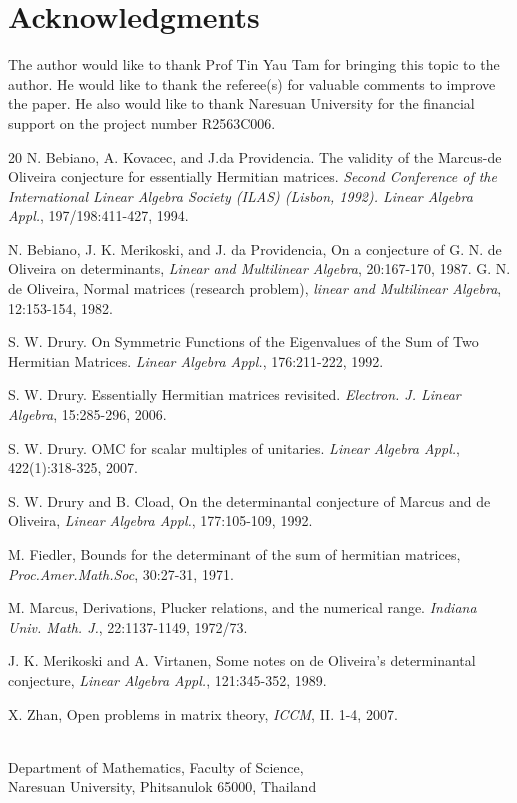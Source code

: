 \documentclass[11pt]{amsart}
\numberwithin{equation}{section}
\numberwithin{equation}{section}
\begin{document}
\section*{Acknowledgments}

The author would like to thank Prof Tin Yau Tam for bringing this topic to the author.  He would like to thank the referee(s) for valuable comments to improve the paper.  He also would like to thank Naresuan University for the financial support on the project number R2563C006.

\begin{thebibliography}{20}
     	N. Bebiano, A. Kovacec, and J.da Providencia. The validity of the Marcus-de Oliveira conjecture for essentially Hermitian matrices. \emph{Second Conference of the International Linear Algebra Society (ILAS) (Lisbon, 1992). Linear Algebra Appl.}, 197/198:411-427, 1994.
	
		N. Bebiano, J. K. Merikoski, and J. da Providencia, On a conjecture of G. N. de Oliveira on determinants, \emph{Linear and Multilinear Algebra}, 20:167-170, 1987.
		G. N. de Oliveira, Normal matrices (research problem),\emph{ linear and Multilinear Algebra}, 12:153-154, 1982.
	
		S. W. Drury.  On Symmetric Functions of the Eigenvalues of the Sum of Two Hermitian Matrices.  \emph{Linear Algebra Appl.}, 176:211-222, 1992.
	
	    S. W. Drury.  Essentially Hermitian matrices revisited.  \emph{Electron. J. Linear Algebra}, 15:285-296, 2006.
	
	    S. W. Drury.  OMC for scalar multiples of unitaries.  \emph{Linear Algebra Appl.}, 422(1):318-325, 2007.
	       
	    S. W. Drury and B. Cload, On the determinantal conjecture of Marcus and de Oliveira, \emph{Linear Algebra Appl.}, 177:105-109, 1992.
	
		M. Fiedler, Bounds for the determinant of the sum of hermitian matrices, \emph{Proc.Amer.Math.Soc}, 30:27-31, 1971.

	M. Marcus, Derivations, Plucker relations, and the numerical range. \emph{Indiana Univ. Math. J.}, 22:1137-1149, 1972/73.


		J. K. Merikoski and A. Virtanen, Some notes on de Oliveira's determinantal conjecture, \emph{Linear Algebra Appl.}, 121:345-352, 1989.

X. Zhan, Open problems in matrix theory, \emph{ICCM}, II. 1-4, 2007.	
		
\end{thebibliography}
\bigskip


\address \textbf{Kijti Rodtes} \\

{ Department of Mathematics, Faculty of Science, \\ Naresuan University, Phitsanulok 65000, Thailand}\\
\\
\end{document}
